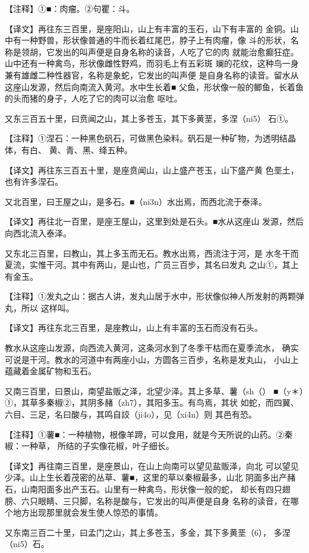 \documentclass[a4paper,12pt,UTF8,twoside]{ctexbook}
\begin{document}
【注释】①■：肉瘤。②句瞿：斗。

【译文】再往东三百里，是座阳山，山上有丰富的玉石，山下有丰富的 金铜。山中有一种野兽，形状像普通的牛而长着红尾巴，脖子上有肉瘤，像 斗的形状，名称是领胡，它发出的叫声便是自身名称的读音，人吃了它的肉 就能治愈癫狂症。山中还有一种禽鸟，形状像雌性野鸡，而羽毛上有五彩斑 斓的花纹，这种鸟一身兼有雄雌二种性器官，名称是象蛇，它发出的叫声便 是自身名称的读音。留水从这座山发源，然后向南流入黄河。水中生长着■ 父鱼，形状像一般的鲫鱼，长着鱼的头而猪的身子，人吃了它的肉可以治愈 呕吐。

又东三百五十里，曰贲闻之山，其上多苍玉，其下多黄垩，多涅（ni5） 石①。

【注释】①涅石：一种黑色矾石，可做黑色染料。矾石是一种矿物，为透明结晶体，有白、 黄、青、黑、绛五种。

【译文】再往东三百五十里，是座贲闻山，山上盛产苍玉，山下盛产黄 色垩土，也有许多涅石。

又北百里，曰王屋之山，是多石。■（ni3n）水出焉，而西北流于泰泽。

【译文】再往北一百里，是座王屋山，这里到处是石头。■水从这座山 发源，然后向西北流入泰泽。

又东北三百里，曰教山，其上多玉而无石。教水出焉，西流注于河，是 水冬干而夏流，实惟干河。其中有两山，是山也，广员三百步，其名曰发丸 之山①，其上有金玉。

【注释】①发丸之山：据古人讲，发丸山居于水中，形状像似神人所发射的两颗弹丸，所以 这样叫。

【译文】再往东北三百里，是座教山，山上有丰富的玉石而没有石头。

教水从这座山发源，向西流入黄河，这条河水到了冬季干枯而在夏季流水， 确实可说是干河。教水的河道中有两座小山，方圆各三百步，名称是发丸山， 小山上蕴藏着金属矿物和玉石。

又南三百里，曰景山，南望盐贩之泽，北望少泽。其上多草、薯（sh（） ■（y＊）①，其草多秦椒②，其阴多赭（zh7），其阳多玉。有鸟焉，其状 如蛇，而四翼、六目、三足，名曰酸与，其鸣自詨（ji4o），见（xi4n）则 其邑有恐。

【注释】①薯■：一种植物，根像羊蹄，可以食用，就是今天所说的山药。②秦椒：一种草， 所结的子实像花椒，叶子细长。

【译文】再往南三百里，是座景山，在山上向南可以望见盐贩泽，向北 可以望见少泽。山上生长着茂密的丛草、薯■，这里的草以秦椒最多，山北 阴面多出产赭石，山南阳面多出产玉石。山里有一种禽鸟，形状像一般的蛇， 却长有四只翅膀、六只眼睛、三只脚，名称是酸与，它发出的叫声便是自身 名称的读音，在哪个地方出现那里就会发生使人惊恐的事情。

又东南三百二十里，曰孟门之山，其上多苍玉，多金，其下多黄垩（6）， 多涅（ni5）石。
\end{document}
